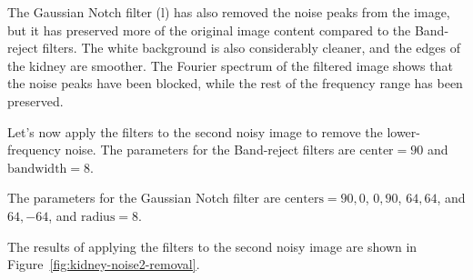 \documentclass[a4paper,12pt]{article}
\begin{document}
The Gaussian Notch filter (l) has also removed the noise peaks from the image, but it has preserved more of the original image content compared to the Band-reject filters. The white background is also considerably cleaner, and the edges of the kidney are smoother. The Fourier spectrum of the filtered image shows that the noise peaks have been blocked, while the rest of the frequency range has been preserved.

Let's now apply the filters to the second noisy image to remove the lower-frequency noise. The parameters for the Band-reject filters are \( \text{center} = 90 \) and \( \text{bandwidth} = 8 \).

The parameters for the Gaussian Notch filter are \( \text{centers} = 90, 0 \), \( 0, 90 \), \( 64, 64 \), and \( 64, -64 \), and \( \text{radius} = 8 \).

The results of applying the filters to the second noisy image are shown in Figure~\ref{fig:kidney-noise2-removal}.
\end{document}
